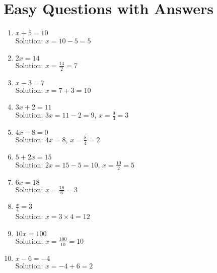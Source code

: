 \documentclass{article}
\begin{document}
\section*{Easy Questions with Answers}
\begin{enumerate}
    \item \( x + 5 = 10 \) \\
          Solution: \( x = 10 - 5 = 5 \)
    \item \( 2x = 14 \) \\
          Solution: \( x = \frac{14}{2} = 7 \)
    \item \( x - 3 = 7 \) \\
          Solution: \( x = 7 + 3 = 10 \)
    \item \( 3x + 2 = 11 \) \\
          Solution: \( 3x = 11 - 2 = 9 \), \( x = \frac{9}{3} = 3 \)
    \item \( 4x - 8 = 0 \) \\
          Solution: \( 4x = 8 \), \( x = \frac{8}{4} = 2 \)
    \item \( 5 + 2x = 15 \) \\
          Solution: \( 2x = 15 - 5 = 10 \), \( x = \frac{10}{2} = 5 \)
    \item \( 6x = 18 \) \\
          Solution: \( x = \frac{18}{6} = 3 \)
    \item \( \frac{x}{4} = 3 \) \\
          Solution: \( x = 3 \times 4 = 12 \)
    \item \( 10x = 100 \) \\
          Solution: \( x = \frac{100}{10} = 10 \)
    \item \( x - 6 = -4 \) \\
          Solution: \( x = -4 + 6 = 2 \)
\end{enumerate}
\end{document}
